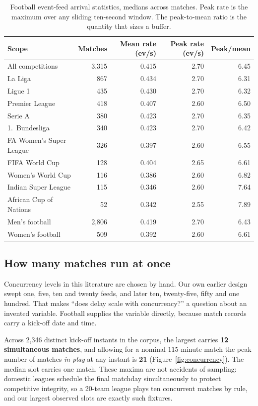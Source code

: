 \documentclass[Afour,sageh,times]{sagej}
\begin{document}
\begin{table}[htbp]
\centering
\caption{Football event-feed arrival statistics, medians across matches. Peak rate is the maximum
over any sliding ten-second window. The peak-to-mean ratio is the quantity that sizes a buffer.}
\label{tab:feedstats}
\begin{tabular}{lrrrr}
\toprule
Scope & Matches & Mean rate (ev/s) & Peak rate (ev/s) & Peak/mean \\
\midrule
All competitions & 3{,}315 & 0.415 & 2.70 & 6.45 \\
\midrule
La Liga & 867 & 0.434 & 2.70 & 6.31 \\
Ligue 1 & 435 & 0.430 & 2.70 & 6.32 \\
Premier League & 418 & 0.407 & 2.60 & 6.50 \\
Serie A & 380 & 0.423 & 2.70 & 6.35 \\
1.~Bundesliga & 340 & 0.423 & 2.70 & 6.42 \\
FA Women's Super League & 326 & 0.397 & 2.60 & 6.55 \\
FIFA World Cup & 128 & 0.404 & 2.65 & 6.61 \\
Women's World Cup & 116 & 0.386 & 2.60 & 6.82 \\
Indian Super League & 115 & 0.346 & 2.60 & 7.64 \\
African Cup of Nations & 52 & 0.342 & 2.55 & 7.89 \\
\midrule
Men's football & 2{,}806 & 0.419 & 2.70 & 6.43 \\
Women's football & 509 & 0.392 & 2.60 & 6.61 \\
\bottomrule
\end{tabular}
\end{table}

\subsection{How many matches run at once}
\label{sec:realconcurrency}

Concurrency levels in this literature are chosen by hand. Our own earlier design swept one, five,
ten and twenty feeds, and later ten, twenty-five, fifty and one hundred. That makes ``does delay
scale with concurrency?'' a question about an invented variable. Football supplies the variable
directly, because match records carry a kick-off date and time.

Across 2{,}346 distinct kick-off instants in the corpus, the largest carries \textbf{12
simultaneous matches}, and allowing for a nominal $115$-minute match the peak number of matches
\emph{in play} at any instant is \textbf{21} (Figure~\ref{fig:concurrency}). The median slot
carries one match. These maxima are not accidents of sampling: domestic leagues schedule the
final matchday simultaneously to protect competitive integrity, so a 20-team league plays ten
concurrent matches by rule, and our largest observed slots are exactly such fixtures.
\end{document}
